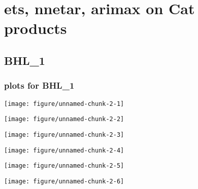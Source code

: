 \documentclass[10pt,a4paper]{article}\usepackage[]{graphicx}\usepackage[]{color}
\makeatletter
\def\maxwidth{ %
  \ifdim\Gin@nat@width>\linewidth
    \linewidth
  \else
    \Gin@nat@width
  \fi
}
\newcommand{\AaA}{\_}
\makeatother
\begin{document}
\tableofcontents


\section{ets, nnetar, arimax on Cat products}

\subsection{BHL\AaA 1}
\subsubsection{plots for BHL\AaA 1}

\texttt{[image: figure/unnamed-chunk-2-1]} 

\newpage

\texttt{[image: figure/unnamed-chunk-2-2]} 

\newpage

\texttt{[image: figure/unnamed-chunk-2-3]} 

\newpage

\texttt{[image: figure/unnamed-chunk-2-4]} 

\newpage

\texttt{[image: figure/unnamed-chunk-2-5]} 

\newpage

\texttt{[image: figure/unnamed-chunk-2-6]} 

\newpage
\end{document}
